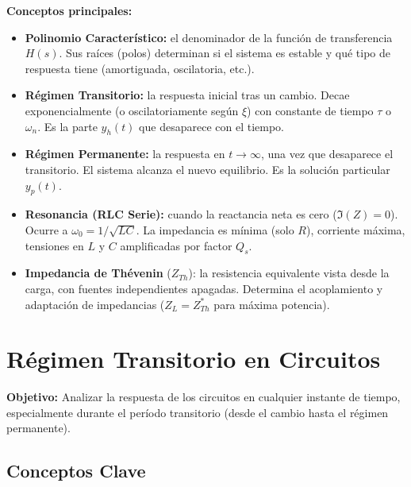 \documentclass[12pt,a4paper]{article}
\begin{document}
\medskip
\textbf{\color{mainblue}Conceptos principales:}

\begin{itemize}[leftmargin=1.5em, itemsep=8pt, parsep=0pt]
  \item \textbf{Polinomio Característico:} el denominador de la función de transferencia $H(s)$. Sus raíces (polos) determinan si el sistema es estable y qué tipo de respuesta tiene (amortiguada, oscilatoria, etc.).
  
  \item \textbf{Régimen Transitorio:} la respuesta inicial tras un cambio. Decae exponencialmente (o oscilatoriamente según $\xi$) con constante de tiempo $\tau$ o $\omega_n$. Es la parte $y_h(t)$ que desaparece con el tiempo.
  
  \item \textbf{Régimen Permanente:} la respuesta en $t \to \infty$, una vez que desaparece el transitorio. El sistema alcanza el nuevo equilibrio. Es la solución particular $y_p(t)$.
  
  \item \textbf{Resonancia (RLC Serie):} cuando la reactancia neta es cero ($\Im(Z) = 0$). Ocurre a $\omega_0 = 1/\sqrt{LC}$. La impedancia es mínima (solo $R$), corriente máxima, tensiones en $L$ y $C$ amplificadas por factor $Q_s$.
  
  \item \textbf{Impedancia de Thévenin} ($Z_{Th}$): la resistencia equivalente vista desde la carga, con fuentes independientes apagadas. Determina el acoplamiento y adaptación de impedancias ($Z_L = Z_{Th}^*$ para máxima potencia).
\end{itemize}

\section{Régimen Transitorio en Circuitos}

\textbf{Objetivo:} Analizar la respuesta de los circuitos en cualquier instante de tiempo,
especialmente durante el período transitorio (desde el cambio hasta el régimen permanente).

\subsection{Conceptos Clave}
\end{document}
